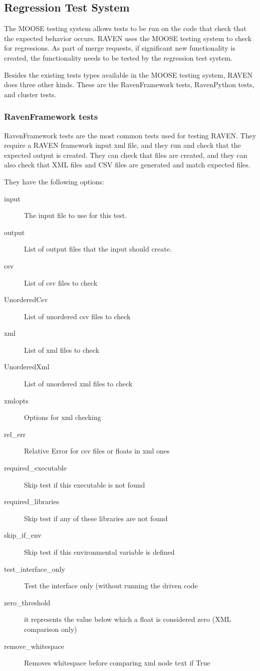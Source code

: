 \documentclass{article}
\begin{document}
\subsection{Regression Test System}


The MOOSE testing system allows tests to be run on the code that check
that the expected behavior occurs.  RAVEN uses the MOOSE testing
system to check for regressions.  As part of merge requests, if
significant new functionality is created, the functionality needs to
be tested by the regression test system.

Besides the existing tests types available in the MOOSE testing
system, RAVEN does three other kinds.  These are the RavenFramework
tests, RavenPython tests, and cluster tests.

\subsubsection{RavenFramework tests}

RavenFramework tests are the most common tests used for testing
RAVEN. They require a RAVEN framework input xml file, and they run and
check that the expected output is created.  They can check that files
are created, and they can also check that XML files and CSV files are
generated and match expected files.

They have the following options:

\begin{description}
    \item[input] The input file to use for this test.
    \item[output] List of output files that the input should create.
    \item[csv] List of csv files to check
    \item[UnorderedCsv] List of unordered csv files to check
    \item[xml] List of xml files to check
    \item[UnorderedXml] List of unordered xml files to check
    \item[xmlopts] Options for xml checking
    \item[rel\_err] Relative Error for csv files or floats in xml ones
    \item[required\_executable] Skip test if this executable is not found
    \item[required\_libraries] Skip test if any of these libraries are not found
    \item[skip\_if\_env] Skip test if this environmental variable is defined
    \item[test\_interface\_only] Test the interface only (without running the driven code
    \item[zero\_threshold] it represents the value below which a float is considered zero (XML comparison only)
    \item[remove\_whitespace] Removes whitespace before comparing xml node text if True
\end{description}
\end{document}

